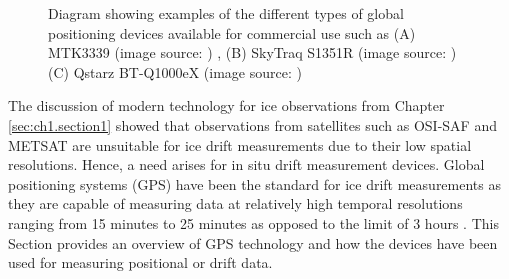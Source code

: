 \begin{figure}[H]
	\centering
	\begin{subfigure}[t]{.3\textwidth}
	\end{subfigure}
	\hfill
	\begin{subfigure}[t]{.3\textwidth}
	\end{subfigure}
	\hfill
	\begin{subfigure}[t]{.3\textwidth}
	\end{subfigure}
	\hfill
	\label{fig:device_gps}
	\caption{Diagram showing examples of the different types of global positioning devices available for commercial use such as (A) MTK3339 (image source: \cite{mtk3339}) , (B) SkyTraq S1351R (image source: \cite{s1315F}) (C) Qstarz BT-Q1000eX (image source: \cite{BTQ1000EX})  }
\end{figure}
The discussion of modern technology for ice observations from Chapter \ref{sec:ch1.section1} showed that observations from satellites such as OSI-SAF and METSAT are unsuitable for ice drift measurements \cite{lepparanta2001sea,galin2011validation} due to their low spatial resolutions. Hence, a need arises for in situ drift measurement devices. Global positioning systems (GPS) have been the standard for ice drift measurements \cite{lepparanta2001sea} as they are capable of measuring data at relatively high temporal resolutions ranging from 15 minutes \cite{alberello2019drift} to 25 minutes \cite{rabault2019open} as opposed to the limit of 3 hours \cite{alberello2019drift}. This Section provides an overview of GPS technology and how the devices have been used for measuring positional or drift data.

